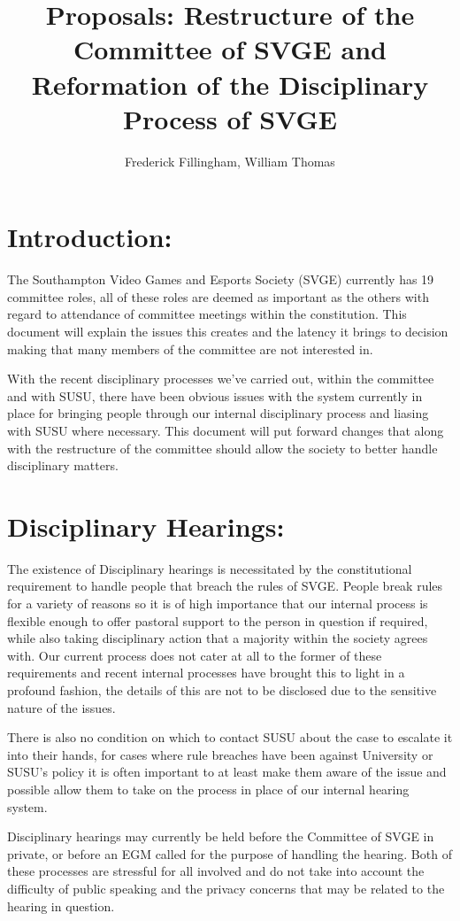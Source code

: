 \documentclass[10pt, a4paper]{article}
\title{Proposals: Restructure of the Committee of SVGE and Reformation of the Disciplinary Process of SVGE}
\author{Frederick Fillingham, William Thomas}
\begin{document}
\maketitle

\section{Introduction:}
The Southampton Video Games and Esports Society (SVGE) currently has 19 committee roles, all of these roles are deemed as important as the others with regard to attendance of committee meetings within the constitution. This document will explain the issues this creates and the latency it brings to decision making that many members of the committee are not interested in.

With the recent disciplinary processes we've carried out, within the committee and with SUSU, there have been obvious issues with the system currently in place for bringing people through our internal disciplinary process and liasing with SUSU where necessary. This document will put forward changes that along with the restructure of the committee should allow the society to better handle disciplinary matters.

\section{Disciplinary Hearings:}
The existence of Disciplinary hearings is necessitated by the constitutional requirement to handle people that breach the rules of SVGE. People break rules for a variety of reasons so it is of high importance that our internal process is flexible enough to offer pastoral support to the person in question if required, while also taking disciplinary action that a majority within the society agrees with. Our current process does not cater at all to the former of these requirements and recent internal processes have brought this to light in a profound fashion, the details of this are not to be disclosed due to the sensitive nature of the issues.

There is also no condition on which to contact SUSU about the case to escalate it into their hands, for cases where rule breaches have been against University or SUSU's policy it is often important to at least make them aware of the issue and possible allow them to take on the process in place of our internal hearing system.

Disciplinary hearings may currently be held before the Committee of SVGE in private, or before an EGM called for the purpose of handling the hearing. Both of these processes are stressful for all involved and do not take into account the difficulty of public speaking and the privacy concerns that may be related to the hearing in question.
\end{document}
